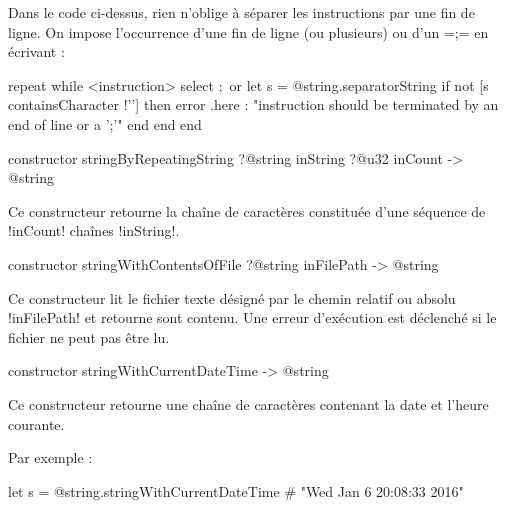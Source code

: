 Dans le code ci-dessus, rien n'oblige à séparer les instructions par une fin de ligne. On impose l'occurrence d'une fin de ligne (ou plusieurs) ou d'un \ggsq=;= en écrivant :

\begin{galgas4}
repeat
while
  <instruction>
  select
   $;$
  or
    let s = @string.separatorString
    if not [s containsCharacter !'\n'] then
      error .here
       : "instruction should be terminated by an end of line or a ';'"
    end
  end
end
\end{galgas4}




\begin{galgas4box}
constructor stringByRepeatingString
  ?@string inString
  ?@u32 inCount
  -> @string
\end{galgas4box}

Ce constructeur retourne la chaîne de caractères constituée d'une séquence de \ggsq!inCount! chaînes \ggsq!inString!.









\begin{galgas4box}
constructor stringWithContentsOfFile ?@string inFilePath -> @string
\end{galgas4box}

Ce constructeur lit le fichier texte désigné par le chemin relatif ou absolu \ggsq!inFilePath! et retourne sont contenu. Une erreur d'exécution est déclenché si le fichier ne peut pas être lu.







\begin{galgas4box}
constructor stringWithCurrentDateTime -> @string
\end{galgas4box}

Ce constructeur retourne une chaîne de caractères contenant la date et l'heure courante.

Par exemple :
\begin{galgas4}
let s = @string.stringWithCurrentDateTime # "Wed Jan  6 20:08:33 2016"
\end{galgas4}








